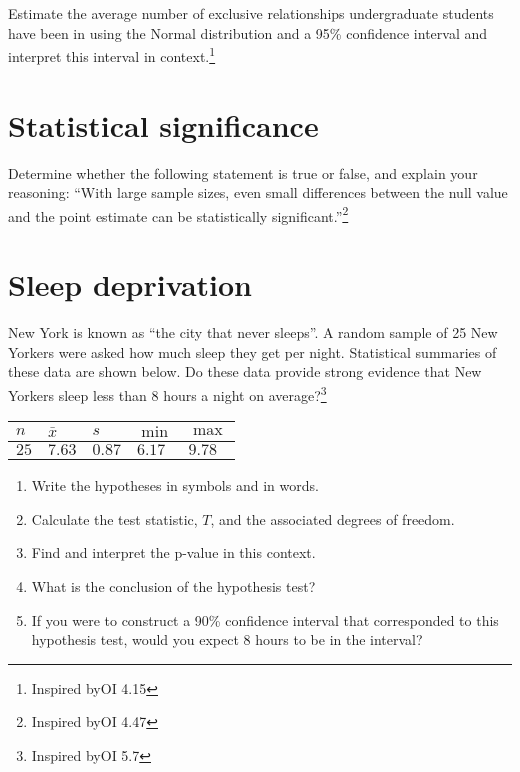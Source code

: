 \documentclass[
]{article}
\begin{document}
Estimate the average number of exclusive relationships undergraduate
students have been in using the Normal distribution and a 95\%
confidence interval and interpret this interval in context.\footnote{Inspired
  byOI 4.15}

\section{Statistical significance}\label{statistical-significance}

Determine whether the following statement is true or false, and explain
your reasoning: ``With large sample sizes, even small differences
between the null value and the point estimate can be statistically
significant.''\footnote{Inspired byOI 4.47}

\section{Sleep deprivation}\label{sleep-deprivation}

New York is known as ``the city that never sleeps''. A random sample of
25 New Yorkers were asked how much sleep they get per night. Statistical
summaries of these data are shown below. Do these data provide strong
evidence that New Yorkers sleep less than 8 hours a night on
average?\footnote{Inspired byOI 5.7}

\begin{longtable}[]{@{}lllll@{}}
\toprule\noalign{}
\(n\) & \(\bar{x}\) & \(s\) & \(\min\) & \(\max\) \\
\midrule\noalign{}
\endhead
\bottomrule\noalign{}
\endlastfoot
\(25\) & \(7.63\) & \(0.87\) & \(6.17\) & \(9.78\) \\
\end{longtable}

\begin{enumerate}
\def\labelenumi{\alph{enumi}.}
\item
  Write the hypotheses in symbols and in words.
\item
  Calculate the test statistic, \(T\), and the associated degrees of
  freedom.
\item
  Find and interpret the p-value in this context.
\item
  What is the conclusion of the hypothesis test?
\item
  If you were to construct a 90\% confidence interval that corresponded
  to this hypothesis test, would you expect 8 hours to be in the
  interval?
\end{enumerate}
\end{document}
